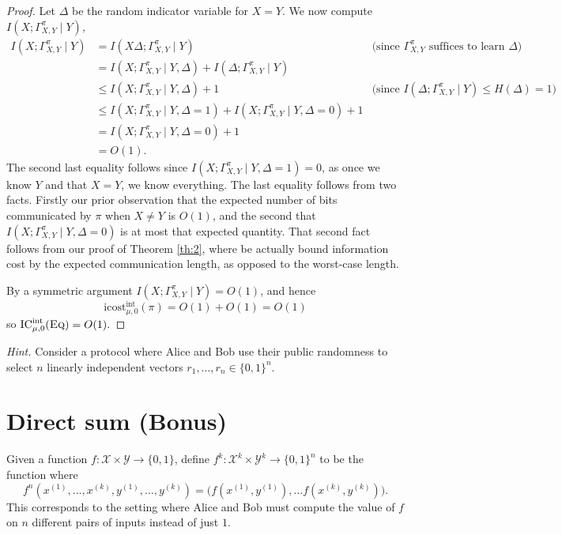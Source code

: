 \documentclass[11pt]{amsart}
\theoremstyle{plain}
\theoremstyle{definition}
\theoremstyle{plain}
\newcommand{\calX}{\mathcal{X}}
\newcommand{\calY}{\mathcal{Y}}
\newcommand{\Eq}{\textsc{Eq}}
\newcommand{\ICint}{\mathrm{IC}^{\mathrm{int}}}
\newcommand{\icostint}{\mathrm{icost}^{\mathrm{int}}}
\begin{document}
\begin{proof}
Let $\Delta$ be the random indicator variable for $X=Y$. We now compute $I(X;\Gamma^\pi_{X,Y}\mid Y)$,
\begin{align*}
I(X;\Gamma^\pi_{X,Y} \mid Y) &= I(X\Delta;\Gamma^\pi_{X,Y}\mid Y) &\text{(since $\Gamma^\pi_{X,Y}$ suffices to learn $\Delta$)} \\
	&= I(X;\Gamma^\pi_{X,Y}\mid Y, \Delta) + I(\Delta;\Gamma^\pi_{X,Y}\mid Y) \\
	&\leq  I(X;\Gamma^\pi_{X,Y}\mid Y, \Delta) + 1  &\text{(since $I(\Delta;\Gamma^\pi_{X,Y}\mid Y) \leq H(\Delta) = 1$)}\\
	&\leq  I(X;\Gamma^\pi_{X,Y}\mid Y, \Delta=1) +  I(X;\Gamma^\pi_{X,Y}\mid Y, \Delta=0) + 1 \\
	&=  I(X;\Gamma^\pi_{X,Y}\mid Y, \Delta=0) + 1 \\
	&= O(1).
\end{align*}
The second last equality follows since $I(X;\Gamma^\pi_{X,Y}\mid Y, \Delta=1)=0$, as once we know $Y$ and that $X=Y$, we know everything. The last equality follows from two facts. Firstly our prior observation that the expected number of bits communicated by $\pi$ when $X\neq Y$ is $O(1)$, and the second that $ I(X;\Gamma^\pi_{X,Y}\mid Y, \Delta=0) $ is at most that expected quantity. That second fact follows from our proof of Theorem \ref{th:2}, where be actually bound information cost by the expected communication length, as opposed to the worst-case length.

By a symmetric argument $I(X;\Gamma^\pi_{X,Y} \mid Y) = O(1)$, and hence
$$\icostint_{\mu,0}(\pi) = O(1) + O(1) = O(1)$$
so $\ICint_{\mu,0}(\Eq) = O(1).$
\end{proof}

\bigskip
\noindent \emph{Hint.} Consider a protocol where Alice and Bob use their public randomness to select $n$ linearly independent vectors $r_1,\ldots,r_n \in \{0,1\}^n$.


\newpage 
\section{Direct sum (Bonus)}

Given a function $f : \calX \times \calY \to \{0,1\}$, define $f^k : \calX^k \times \calY^k \to \{0,1\}^n$ to be the function where
\[
f^n(x^{(1)},\ldots,x^{(k)},y^{(1)},\ldots,y^{(k)}) = \big( f(x^{(1)},y^{(1)}), \ldots f(x^{(k)}, y^{(k)})\big).
\]
This corresponds to the setting where Alice and Bob must compute the value of $f$ on $n$ different pairs of inputs instead of just $1$.
\end{document}
